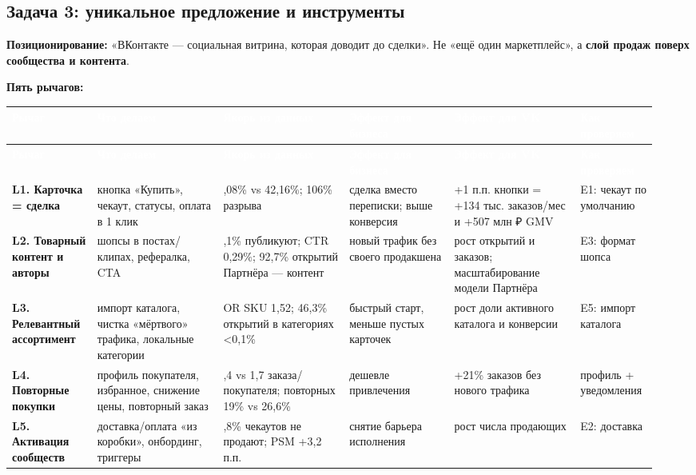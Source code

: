 \documentclass[10pt,a4paper]{article}
\begin{document}
\subsection{Задача 3: уникальное предложение и инструменты}

\textbf{Позиционирование:} «ВКонтакте — социальная витрина, которая доводит до сделки». Не «ещё один маркетплейс», а \textbf{слой продаж поверх сообщества и контента}.\par

\noindent\textbf{Пять рычагов:}\par\vspace{4pt}

\begingroup
\footnotesize
\setlength{\tabcolsep}{3pt}
\renewcommand{\arraystretch}{1.12}
\begin{longtable}{@{}>{\raggedright\arraybackslash}p{0.1188\linewidth}>{\raggedright\arraybackslash}p{0.1885\linewidth}>{\raggedright\arraybackslash}p{0.1885\linewidth}>{\raggedright\arraybackslash}p{0.1598\linewidth}>{\raggedright\arraybackslash}p{0.1885\linewidth}>{\raggedright\arraybackslash}p{0.0942\linewidth}@{}}
\rowcolor{blue}
\textcolor{white}{\textbf{Рычаг}} & \textcolor{white}{\textbf{Что делаем}} & \textcolor{white}{\textbf{Якорь из данных}} & \textcolor{white}{\textbf{Эффект для бизнеса}} & \textcolor{white}{\textbf{Эффект для VK}} & \textcolor{white}{\textbf{Как проверяем}} \\
\endfirsthead
\rowcolor{blue}
\textcolor{white}{\textbf{Рычаг}} & \textcolor{white}{\textbf{Что делаем}} & \textcolor{white}{\textbf{Якорь из данных}} & \textcolor{white}{\textbf{Эффект для бизнеса}} & \textcolor{white}{\textbf{Эффект для VK}} & \textcolor{white}{\textbf{Как проверяем}} \\
\endhead
\hline
\textbf{L1. Карточка = сделка} & кнопка «Купить», чекаут, статусы, оплата в 1 клик & 3,08\% vs 42,16\%; 106\% разрыва & сделка вместо переписки; выше конверсия & +1 п.п. кнопки = +134 тыс. заказов/мес и +507 млн ₽ GMV & E1: чекаут по умолчанию \\
\textbf{L2. Товарный контент и авторы} & шопсы в постах/клипах, рефералка, CTA & 3,1\% публикуют; CTR 0,29\%; 92,7\% открытий Партнёра — контент & новый трафик без своего продакшена & рост открытий и заказов; масштабирование модели Партнёра & E3: формат шопса \\
\textbf{L3. Релевантный ассортимент} & импорт каталога, чистка «мёртвого» трафика, локальные категории & OR SKU 1,52; 46,3\% открытий в категориях <0,1\% & быстрый старт, меньше пустых карточек & рост доли активного каталога и конверсии & E5: импорт каталога \\
\textbf{L4. Повторные покупки} & профиль покупателя, избранное, снижение цены, повторный заказ & 1,4 vs 1,7 заказа/покупателя; повторных 19\% vs 26,6\% & дешевле привлечения & +21\% заказов без нового трафика & профиль + уведомления \\
\textbf{L5. Активация сообществ} & доставка/оплата «из коробки», онбординг, триггеры & 94,8\% чекаутов не продают; PSM +3,2 п.п. & снятие барьера исполнения & рост числа продающих & E2: доставка \\
\hline
\end{longtable}
\endgroup
\vspace{4pt}
\end{document}
